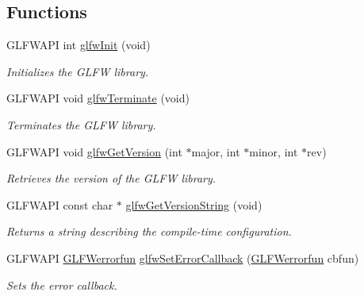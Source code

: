 \subsection*{Functions}
\begin{DoxyCompactItemize}
\item 
G\+L\+F\+W\+A\+PI int \hyperlink{group__init_gab41771f0215a2e0afb4cf1cf98082d40}{glfw\+Init} (void)
\begin{DoxyCompactList}\small\item\em Initializes the G\+L\+FW library. \end{DoxyCompactList}\item 
G\+L\+F\+W\+A\+PI void \hyperlink{group__init_gafd90e6fd4819ea9e22e5e739519a6504}{glfw\+Terminate} (void)
\begin{DoxyCompactList}\small\item\em Terminates the G\+L\+FW library. \end{DoxyCompactList}\item 
G\+L\+F\+W\+A\+PI void \hyperlink{group__init_ga2402c7824ac0194c13722790ff9559ff}{glfw\+Get\+Version} (int $\ast$major, int $\ast$minor, int $\ast$rev)
\begin{DoxyCompactList}\small\item\em Retrieves the version of the G\+L\+FW library. \end{DoxyCompactList}\item 
G\+L\+F\+W\+A\+PI const char $\ast$ \hyperlink{group__init_gae5952184a0db36e24d1de7805b8b0945}{glfw\+Get\+Version\+String} (void)
\begin{DoxyCompactList}\small\item\em Returns a string describing the compile-\/time configuration. \end{DoxyCompactList}\item 
G\+L\+F\+W\+A\+PI \hyperlink{group__init_ga6b8a2639706d5c409fc1287e8f55e928}{G\+L\+F\+Werrorfun} \hyperlink{group__init_ga5919096b958c47102126061fb5a6f9c3}{glfw\+Set\+Error\+Callback} (\hyperlink{group__init_ga6b8a2639706d5c409fc1287e8f55e928}{G\+L\+F\+Werrorfun} cbfun)
\begin{DoxyCompactList}\small\item\em Sets the error callback. \end{DoxyCompactList}\end{DoxyCompactItemize}
